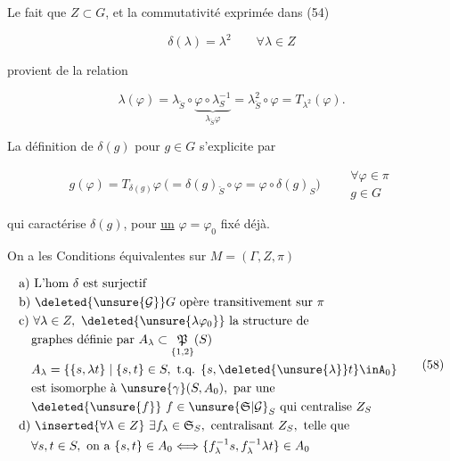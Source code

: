 
Le fait que $Z\subset G$, et la commutativité exprimée dans (54)

\[
\delta(\lambda)=\lambda^2\qquad\forall\lambda\in Z
\tag*{(56)}
\]

provient de la relation

\[
\lambda(\varphi)=\lambda_{\check S}\circ\underbrace{\varphi\circ\lambda_S^{-1}}_{\lambda_{\check S}\varphi}=\lambda_{\check S}^{2}\circ\varphi=T_{\lambda^2}(\varphi).
\]

La définition de $\delta(g)$ pour $g\in G$ s'explicite par

\[
g(\varphi)=T_{\delta(g)}\varphi\ \bigl(=\delta(g)_{\check S}\circ\varphi=\varphi\circ\delta(g)_S\bigr)\qquad\substack{\forall\varphi\in\pi\\g\in G}
\tag*{(57)}
\]

qui caractérise \deleted{\unsure{$\forall$}} $\delta(g)$, pour \uline{un} $\varphi=\varphi_0$ fixé déjà.

On a les Conditions équivalentes sur $M=(\Gamma,Z,\pi)$

\[
\begin{aligned}
&\text{a) L'hom }\delta\text{ est surjectif}\\
&\text{b) }\deleted{\unsure{\mathcal G}}G\text{ opère transitivement sur }\pi\\
&\text{c) }\forall\lambda\in Z,\ \deleted{\unsure{\lambda\varphi_0}}\ \text{la structure de}\\
&\quad\text{graphes définie par } A_\lambda\subset\underset{\{1,2\}}{\mathfrak P}(S)\\
&\quad A_\lambda=\{\{s,\lambda t\}\mid\{s,t\}\in S,\ \text{t.q. }\{s,\deleted{\unsure{\lambda}}t\}\inA_0\}\\
&\quad\text{est isomorphe à }\unsure{\gamma}(S,A_0),\ \text{par une}\\
&\quad\deleted{\unsure{f}}\ f\in\unsure{\mathfrak S|\mathcal G}_S\text{ qui centralise }Z_S\\
&\text{d) }\inserted{\forall\lambda\in Z}\ \exists f_\lambda\in\mathfrak S_S,\ \text{centralisant }Z_S,\ \text{telle que}\\
&\quad\forall s,t\in S,\ \text{on a }\{s,t\}\in A_0\Longleftrightarrow\{f_\lambda^{-1}s,f_\lambda^{-1}\lambda t\}\in A_0
\end{aligned}
\tag*{(58)}
\]

